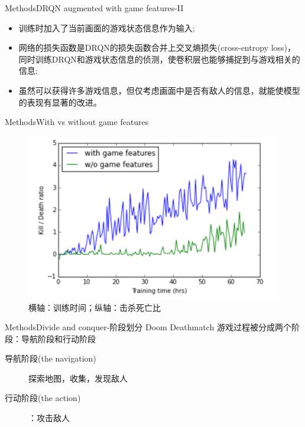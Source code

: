 \documentclass[10pt]{beamer}
\begin{document}
	\begin{frame}{Methods}{DRQN augmented with game features-II}
		\begin{itemize}
			\item 训练时加入了当前画面的游戏状态信息作为输入;
			
			\item 网络的损失函数是DRQN的损失函数合并上交叉熵损失(cross-entropy loss)，同时训练DRQN和游戏状态信息的侦测，使卷积层也能够捕捉到与游戏相关的信息;
			
			\item 虽然可以获得许多游戏信息，但仅考虑画面中是否有敌人的信息，就能使模型的表现有显著的改进。
		\end{itemize}
	\end{frame}

	\begin{frame}{Methods}{With vs without game features}
		\begin{figure}
			\centering
			\includegraphics[width=0.7\linewidth]{pictures/with-game-features-result}
			\caption{横轴：训练时间；纵轴：击杀死亡比}
			\label{fig:with-game-features-result}
		\end{figure}
	\end{frame}

	\begin{frame}{Methods}{Divide and conquer-阶段划分}
		Doom Deathmatch 游戏过程被分成两个阶段：导航阶段和行动阶段
		\begin{description}
			\item[导航阶段(the navigation)]  探索地图，收集，发现敌人
			\item[行动阶段(the action)]：攻击敌人
		\end{description}
		
	
	\end{frame}
\end{document}
